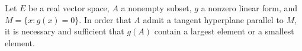 Let $E$ be a real vector space, $A$ a nonempty subset, $g$ a nonzero linear form, and $M = \{x : g(x) = 0\}$. In order that $A$ admit a tangent hyperplane parallel to $M$, it is necessary and sufficient that $g(A)$ contain a largest element or a smallest element.